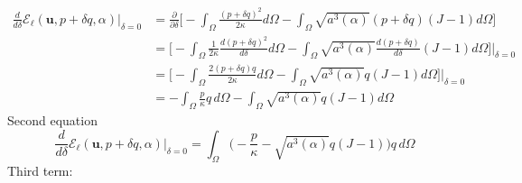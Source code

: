 \documentclass[12pt,3p]{article}
\numberwithin{equation}{section}
\begin{document}
\begin{align*}
\frac{d}{d \delta} \mathcal{E}_\ell (\bm{u}, p + \delta q, \alpha) \big\rvert_{\delta = 0} 
	&= \frac{\partial}{\partial \delta} \bigg[ - \int_{\Omega} \frac{(p+ \delta q)^2}{2 \kappa} d \Omega - \int_{\Omega} \sqrt{a^3 (\alpha)} (p + \delta q ) (J-1) d \Omega \bigg] \\
	&= \bigg[ - \int_{\Omega} \frac{1}{2 \kappa} \frac{d (p+ \delta q)^2}{d \delta}d \Omega - \int_{\Omega} \sqrt{a^3 (\alpha)} \frac{d(p + \delta q )}{d \delta} (J-1) d \Omega \bigg] \bigg\rvert_{\delta = 0} \\
	&= \bigg[ - \int_{\Omega} \frac{2 (p+ \delta q) q}{2 \kappa} d \Omega - \int_{\Omega} \sqrt{a^3 (\alpha)} q (J-1) d \Omega \bigg] \bigg\rvert_{\delta = 0} \\
	&= - \int_{\Omega} \frac{p}{\kappa} q \, d \Omega - \int_{\Omega} \sqrt{a^3 (\alpha)} q (J-1) d \Omega 
\end{align*}
Second equation 
\begin{equation}\label{Eq:WeakForm2}
\frac{d}{d \delta} \mathcal{E}_\ell (\bm{u}, p + \delta q, \alpha) \big\rvert_{\delta = 0} 
= \int_{\Omega} \bigg( - \frac{p}{\kappa} - \sqrt{a^3 (\alpha)} q (J-1) \bigg) q \, d \Omega 
\end{equation}
Third term: 
\end{document}

